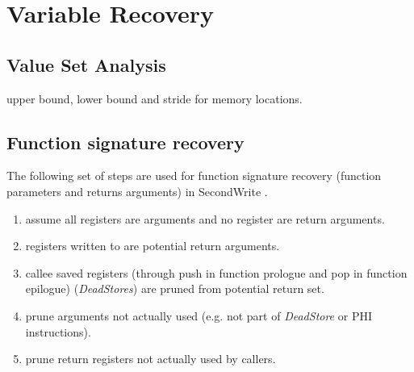 
\section{Variable Recovery}



\subsection{Value Set Analysis}


upper bound, lower bound and stride for memory locations.



\subsection{Function signature recovery}



The following set of steps are used for function signature recovery (function parameters and returns arguments) in SecondWrite \cite{second_write_scalable_type_detection}.

\begin{enumerate}
	\item assume all registers are arguments and no register are return arguments.
	\item registers written to are potential return arguments.
	\item callee saved registers (through push in function prologue and pop in function epilogue) (\textit{DeadStores}) are pruned from potential return set.
	\item prune arguments not actually used (e.g. not part of \textit{DeadStore} or PHI instructions).
	\item prune return registers not actually used by callers.
\end{enumerate}
